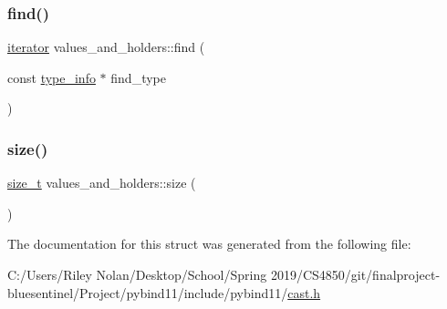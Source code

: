 \mbox{\label{structvalues__and__holders_a79d8d4f6c0ce4e415ceb08c527b109c7}} 
\subsubsection{\texorpdfstring{find()}{find()}}
{\footnotesize\ttfamily \mbox{\hyperlink{structvalues__and__holders_1_1iterator}{iterator}} values\+\_\+and\+\_\+holders\+::find (\begin{DoxyParamCaption}\item[{const \mbox{\hyperlink{structtype__info}{type\+\_\+info}} $\ast$}]{find\+\_\+type }\end{DoxyParamCaption})\hspace{0.3cm}{\ttfamily [inline]}}

\mbox{\label{structvalues__and__holders_ae7926ada8dea44baacbee204160e641d}} 
\subsubsection{\texorpdfstring{size()}{size()}}
{\footnotesize\ttfamily \mbox{\hyperlink{detail_2common_8h_a801d6a451a01953ef8cbae6feb6a3638}{size\+\_\+t}} values\+\_\+and\+\_\+holders\+::size (\begin{DoxyParamCaption}{ }\end{DoxyParamCaption})\hspace{0.3cm}{\ttfamily [inline]}}



The documentation for this struct was generated from the following file\+:\begin{DoxyCompactItemize}
\item 
C\+:/\+Users/\+Riley Nolan/\+Desktop/\+School/\+Spring 2019/\+C\+S4850/git/finalproject-\/bluesentinel/\+Project/pybind11/include/pybind11/\mbox{\hyperlink{cast_8h}{cast.\+h}}\end{DoxyCompactItemize}
